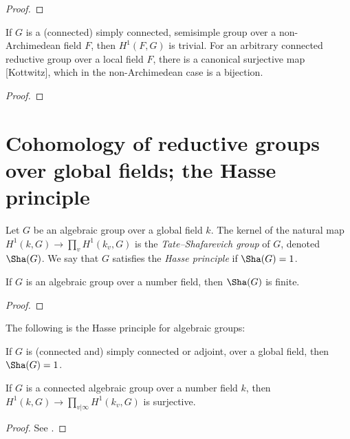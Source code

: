\begin{proof}
 
\end{proof}


\begin{theorem}
 \label{theorem-H1-trivial}
If $G$ is a (connected) simply connected, semisimple group over a non-Archimedean field $F$, then $H^1(F,G)$ is trivial. For an arbitrary connected reductive group over a local field $F$, there is a canonical surjective map [Kottwitz], which in the non-Archimedean case is a bijection.
\end{theorem}

\begin{proof}
 
\end{proof}

\section{Cohomology of reductive groups over global fields; the Hasse principle}
\label{section-global-fields}

\begin{definition}
 \label{definition-Sha-Hasse}
Let $G$ be an algebraic group over a global field $k$. The kernel of the natural map $H^1(k,G)\to \prod_v H^1(k_v, G)$ is the {\it Tate--Shafarevich group} of $G$, denoted $\Sha(G)$. We say that $G$ satisfies the {\it Hasse principle} if $\Sha(G)=1$.
\end{definition}



\begin{theorem}
 \label{theorem-Sha-finite}
 If $G$ is an algebraic group over a number field, then $\Sha(G)$ is finite.
\end{theorem}

\begin{proof}
 
\end{proof}


The following is the Hasse principle for algebraic groups:

\begin{theorem}
 \label{theorem-Hasse-principle}
If $G$ is (connected and) simply connected or adjoint, over a global field, then $\Sha(G) =1$.
\end{theorem}

\begin{proposition}
 \label{proposition-H1-surjects}
If $G$ is a connected algebraic group over a number field $k$, then $H^1(k,G) \to \prod_{v|\infty} H^1(k_v, G)$ is surjective.
\end{proposition}


\begin{proof}
 See \cite[Proposition 6.17]{Platonov-Rapinchuk}.
\end{proof}

















